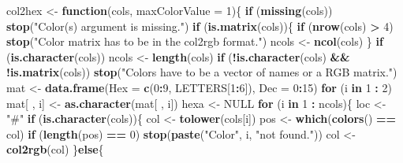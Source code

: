 \documentclass[]{article}
\newenvironment{Shaded}{\begin{snugshade}}{\end{snugshade}}
\newcommand{\ControlFlowTok}[1]{\textcolor[rgb]{0.13,0.29,0.53}{\textbf{#1}}}
\newcommand{\DataTypeTok}[1]{\textcolor[rgb]{0.13,0.29,0.53}{#1}}
\newcommand{\DecValTok}[1]{\textcolor[rgb]{0.00,0.00,0.81}{#1}}
\newcommand{\KeywordTok}[1]{\textcolor[rgb]{0.13,0.29,0.53}{\textbf{#1}}}
\newcommand{\NormalTok}[1]{#1}
\newcommand{\OperatorTok}[1]{\textcolor[rgb]{0.81,0.36,0.00}{\textbf{#1}}}
\newcommand{\OtherTok}[1]{\textcolor[rgb]{0.56,0.35,0.01}{#1}}
\newcommand{\StringTok}[1]{\textcolor[rgb]{0.31,0.60,0.02}{#1}}
\begin{document}
\begin{Shaded}
\begin{Highlighting}[]
\NormalTok{col2hex <-}\StringTok{ }\ControlFlowTok{function}\NormalTok{(cols, }\DataTypeTok{maxColorValue =} \DecValTok{1}\NormalTok{)\{}
\ControlFlowTok{if}\NormalTok{ (}\KeywordTok{missing}\NormalTok{(cols))}
\KeywordTok{stop}\NormalTok{(}\StringTok{"Color(s) argument is missing."}\NormalTok{)}
\ControlFlowTok{if}\NormalTok{ (}\KeywordTok{is.matrix}\NormalTok{(cols))\{}
\ControlFlowTok{if}\NormalTok{ (}\KeywordTok{nrow}\NormalTok{(cols) }\OperatorTok{>}\StringTok{ }\DecValTok{4}\NormalTok{)}
\KeywordTok{stop}\NormalTok{(}\StringTok{"Color matrix has to be in the col2rgb format."}\NormalTok{)}
\NormalTok{ncols <-}\StringTok{ }\KeywordTok{ncol}\NormalTok{(cols)}
\NormalTok{\}}
\ControlFlowTok{if}\NormalTok{ (}\KeywordTok{is.character}\NormalTok{(cols)) ncols <-}\StringTok{ }\KeywordTok{length}\NormalTok{(cols)}
\ControlFlowTok{if}\NormalTok{ (}\OperatorTok{!}\KeywordTok{is.character}\NormalTok{(cols) }\OperatorTok{&&}\StringTok{ }\OperatorTok{!}\KeywordTok{is.matrix}\NormalTok{(cols))}
\KeywordTok{stop}\NormalTok{(}\StringTok{"Colors have to be a vector of names or a RGB matrix."}\NormalTok{)}
\NormalTok{mat <-}\StringTok{ }\KeywordTok{data.frame}\NormalTok{(}\DataTypeTok{Hex =} \KeywordTok{c}\NormalTok{(}\DecValTok{0}\OperatorTok{:}\DecValTok{9}\NormalTok{, LETTERS[}\DecValTok{1}\OperatorTok{:}\DecValTok{6}\NormalTok{]), }\DataTypeTok{Dec =} \DecValTok{0}\OperatorTok{:}\DecValTok{15}\NormalTok{)}
\ControlFlowTok{for}\NormalTok{ (i }\ControlFlowTok{in} \DecValTok{1} \OperatorTok{:}\StringTok{ }\DecValTok{2}\NormalTok{) mat[ , i] <-}\StringTok{ }\KeywordTok{as.character}\NormalTok{(mat[ , i])}
\NormalTok{hexa <-}\StringTok{ }\OtherTok{NULL}
\ControlFlowTok{for}\NormalTok{ (i }\ControlFlowTok{in} \DecValTok{1} \OperatorTok{:}\StringTok{ }\NormalTok{ncols)\{}
\NormalTok{loc <-}\StringTok{ "#"}
\ControlFlowTok{if}\NormalTok{ (}\KeywordTok{is.character}\NormalTok{(cols))\{}
\NormalTok{col <-}\StringTok{ }\KeywordTok{tolower}\NormalTok{(cols[i])}
\NormalTok{pos <-}\StringTok{ }\KeywordTok{which}\NormalTok{(}\KeywordTok{colors}\NormalTok{() }\OperatorTok{==}\StringTok{ }\NormalTok{col)}
\ControlFlowTok{if}\NormalTok{ (}\KeywordTok{length}\NormalTok{(pos) }\OperatorTok{==}\StringTok{ }\DecValTok{0}\NormalTok{)}
\KeywordTok{stop}\NormalTok{(}\KeywordTok{paste}\NormalTok{(}\StringTok{"Color"}\NormalTok{, i, }\StringTok{"not found."}\NormalTok{))}
\NormalTok{col <-}\StringTok{ }\KeywordTok{col2rgb}\NormalTok{(col)}
\NormalTok{\}}\ControlFlowTok{else}\NormalTok{\{}

\end{Highlighting}
\end{Shaded}
\end{document}
